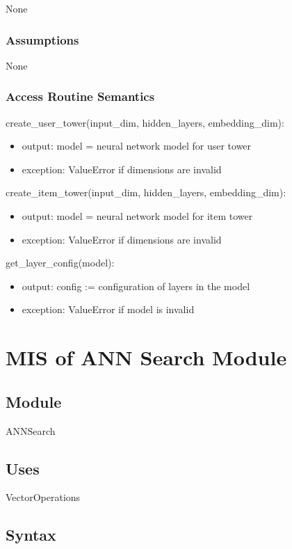 \documentclass[12pt, titlepage]{article}
\begin{document}
None

\subsubsection{Assumptions}

None

\subsubsection{Access Routine Semantics}

\noindent create\_user\_tower(input\_dim, hidden\_layers, embedding\_dim):
\begin{itemize}
\item output: model = neural network model for user tower
\item exception: ValueError if dimensions are invalid
\end{itemize}

\noindent create\_item\_tower(input\_dim, hidden\_layers, embedding\_dim):
\begin{itemize}
\item output: model = neural network model for item tower
\item exception: ValueError if dimensions are invalid
\end{itemize}

\noindent get\_layer\_config(model):
\begin{itemize}
\item output: config := configuration of layers in the model
\item exception: ValueError if model is invalid
\end{itemize}

\section{MIS of ANN Search Module} \label{ModuleANN}

\subsection{Module}

ANNSearch

\subsection{Uses}
VectorOperations

\subsection{Syntax}
\end{document}
